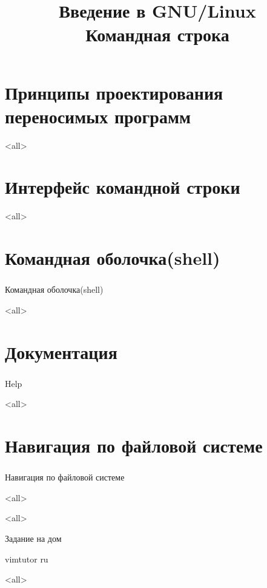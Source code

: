
\title{Введение в GNU/Linux\\Командная строка}


\begin{frame}
 \frametitle{}
 \titlepage
\end{frame}

\section{Принципы проектирования переносимых программ}
\mode<all>{}

\section{Интерфейс командной строки}
\mode<all>{}

\section{ Командная оболочка(shell) }
\begin{frame}
\frametitle{}
 \begin{center}
   {\Large Командная оболочка(shell) }
 \end{center}
\end{frame}

\mode<all>{}

\section{ Документация }
\begin{frame}
\frametitle{}
 \begin{center}
   {\Large Help }
 \end{center}
\end{frame}
\mode<all>{}

\section{ Навигация по файловой системе}
\begin{frame}
\frametitle{}
 \begin{center}
   {\Large Навигация по файловой системе }
 \end{center}
\end{frame}
\mode<all>{}

\mode<all>{}

\begin{frame}{Задание на дом}
\begin{block}{}
vimtutor ru
\end{block}
\end{frame}

\mode<all>

